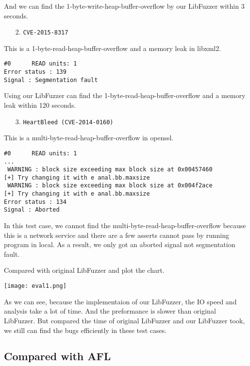 And we can find the 1-byte-write-heap-buffer-overflow by our LibFuzzer within 3 seconds.

\begin{enumerate}
    \item [2.] \texttt{CVE-2015-8317}
\end{enumerate}

This is a 1-byte-read-heap-buffer-overflow and a memory leak in libxml2.

\begin{lstlisting}
#0      READ units: 1
Error status : 139
Signal : Segmentation fault
\end{lstlisting}

Using our LibFuzzer can find the 1-byte-read-heap-buffer-overflow and a memory leak within 120 seconds.

\begin{enumerate}
    \item [3.] \texttt{HeartBleed (CVE-2014-0160)}
\end{enumerate}

This is a multi-byte-read-heap-buffer-overflow in openssl.

\begin{lstlisting}
#0      READ units: 1
...
 WARNING : block size exceeding max block size at 0x00457460
[+] Try changing it with e anal.bb.maxsize
 WARNING : block size exceeding max block size at 0x004f2ace
[+] Try changing it with e anal.bb.maxsize
Error status : 134
Signal : Aborted
\end{lstlisting}

In this test case, we cannot find the multi-byte-read-heap-buffer-overflow because this is a network service and there are a few asserts cannot pass by running program in local. As a result, we only got an aborted signal not segmentation fault.

Compared with original LibFuzzer and plot the chart.

\texttt{[image: eval1.png]}

As we can see, because the implementaion of our LibFuzzer, the IO speed and analysis take a lot of time. And the preformance is slower than original LibFuzzer. But compared the time of original LibFuzzer and our LibFuzzer took, we still can find the bugs efficiently in these test cases.

\subsection{Compared with AFL}


